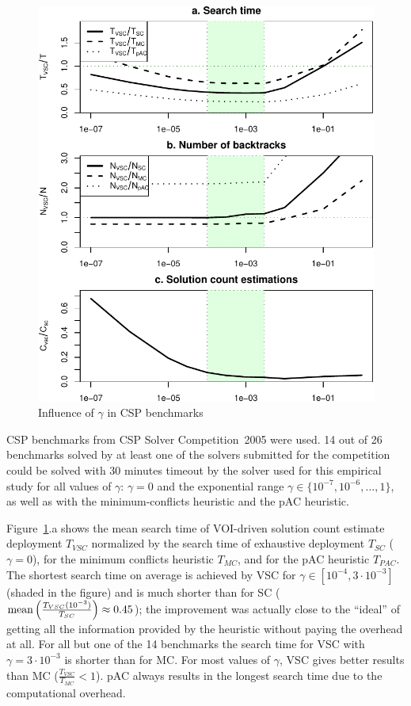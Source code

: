 \begin{figure}[h]
\centering
\includegraphics[scale=0.75]{csp-benchmarks.pdf}
\caption{Influence of $\gamma$ in CSP benchmarks}
\label{fig:benchmarks}
\end{figure}

CSP benchmarks from CSP Solver Competition~2005
\cite{Boussemart.benchmarks} were used. 14 out of 26 benchmarks
solved by at least one of the solvers submitted for the competition
could be solved with 30 minutes timeout by the solver used for this
empirical study for all values of $\gamma$: $\gamma=0$ and the
exponential range $\gamma \in \{10^{-7}, 10^{-6}, ..., 1\}$, as well
as with the minimum-conflicts heuristic and the pAC heuristic.

Figure~\ref{fig:benchmarks}.a shows the mean search time of VOI-driven
solution count estimate deployment $T_{VSC}$ normalized by the search
time of exhaustive deployment $T_{SC}$ ($\gamma=0$), for the minimum
conflicts heuristic $T_{MC}$, and for the pAC heuristic $T_{PAC}$.
The shortest search time on average is achieved by VSC for $\gamma \in
[10^{-4},3\cdot10^{-3}]$ (shaded in the figure) and is much shorter
than for SC ($\mathop{\mathrm{mean}} \left(\frac {T_{VSC}(10^{-3})}
{T_{SC}}\right)\approx 0.45$); the improvement was
  actually close to the ``ideal'' of getting all the information
  provided by the heuristic without paying the overhead at all. For
all but one of the 14 benchmarks the search time for VSC with
$\gamma=3\cdot10^{-3}$ is shorter than for MC. For most values of
$\gamma$, VSC gives better results than MC ($\frac {T_{VSC}} {T_{MC}}
< 1$). pAC always results in the longest search time due to the
computational overhead.

